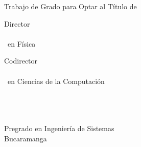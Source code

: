 \thispagestyle{plain}
\begin{center}

        \tit

        \vspace{6em}

        \nam

        \vspace{5em}

        Trabajo de Grado para Optar al Título de \opta

        \vspace{5em}

        Director\\
        \dir\\
        \tdir\ en Física

        \vspace{3em}

        Codirector\\
        \cdir\\
        \tcdir\ en Ciencias de la Computación

        \vspace{4em}

        \uni \\
        \fac \\
        \esc \\
        Pregrado en Ingeniería de Sistemas \\
        Bucaramanga \\
        \the\year

\end{center}

